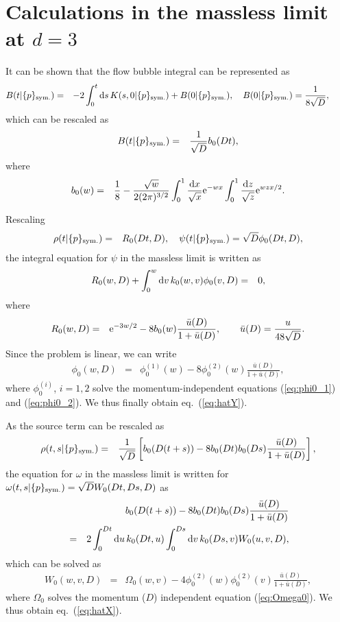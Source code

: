 \documentclass[preprint]{ptephy_v1}%
\newcommand{\rme}{{\rm e}}
\newcommand{\rmd}{{\rm d}}
\begin{document}
\section{Calculations in the massless limit at $d=3$}
\label{app:massless}
 It can be shown that the flow bubble integral can be represented as
\begin{eqnarray}
B(t\vert  \{ p\}_{\rm sym.}) &=& -2\int_0^{ t} \rmd s\,  K (s,0 \vert   \{ p\}_{\rm sym.}) + B(0\vert   \{ p\}_{\rm sym.}), \quad B(0\vert   \{ p\}_{\rm sym.}) =\frac{1}{8\sqrt{D}},~~~~~~~
\end{eqnarray}
which can be rescaled as
\begin{eqnarray}
B(t\vert  \{ p\}_{\rm sym.}) &=& \frac{1}{\sqrt{D}}b_0(Dt),
\end{eqnarray}
where
\begin{eqnarray}
b_0(w) &=&\frac{1}{8} -\frac{\sqrt{w}}{2(2\pi)^{3/2}}\int_0^1\frac{ \rmd x}{\sqrt{x}}\rme^{-wx}\int_0^1\frac{ \rmd z}{\sqrt{z}}\rme^{wzx/2}.
\label{eq:b0}
\end{eqnarray}

Rescaling
\begin{eqnarray}
\rho(t\vert   \{ p\}_{\rm sym.}) &=& R_0(Dt, D),
\quad
\psi(t \vert   \{ p\}_{\rm sym.}) = \sqrt{D} \phi_0(Dt,D),
\end{eqnarray}
the integral equation for $\psi$ in the massless limit is written as
\begin{eqnarray}
R_0(w, D) +\int_0^w \rmd v\, k_0(w,v) \phi_0(v,D) &=& 0 ,
\end{eqnarray}
where
\begin{eqnarray}
R_0(w,D) &=& \rme^{-3w/2} -8b_0(w)\dfrac{\bar u(D)}{1+ \bar u(D)},
\qquad \bar u(D)= \dfrac{u}{48\sqrt{D}}.
\end{eqnarray}
Since the problem is linear, we can write
\begin{eqnarray}
\phi_0(w,D) &=& \phi_0^{(1)}(w) - 8 \phi_0^{(2)}(w) \frac{\bar u(D)}{1+\bar u(D)} ,
\end{eqnarray}
where $\phi_0^{(i)}$,  $i=1,2$ solve the momentum-independent equations (\ref{eq:phi0_1}) and (\ref{eq:phi0_2}).
We thus finally obtain eq.~(\ref{eq:hatY}).

As the source term can be rescaled as
\begin{eqnarray}
\rho(t,s\vert  \{ p\}_{\rm sym.}) &=&\frac{1}{\sqrt{D}}\left[ b_0(D(t+s)) -8 b_0(Dt) b_0(Ds)\frac{\bar u(D)}{1+\bar u(D)} \right], 
\end{eqnarray}
the equation for $\omega$ in the massless limit is written for $\omega(t,s\vert  \{ p\}_{\rm sym.})= \sqrt{D}W_0(Dt,Ds,D)$ as
\begin{eqnarray}
&&b_0(D(t+s)) -8 b_0(Dt) b_0(Ds)\frac{\bar u(D)}{1+\bar u(D)} \nonumber \\&=&
2\int_0^{Dt} \rmd u\, k_0(Dt,u) \int_0^{Ds} \rmd v\, k_0(Ds,v) W_0( u,v,D),
\end{eqnarray}
which can be solved as
\begin{eqnarray}
W_0(w,v , D) &=& \Omega_0(w,v) - 4 \phi_0^{(2)}(w) \phi_0^{(2)}(v) \frac{\bar u(D)} {1+\bar u(D)},
\end{eqnarray}
where $\Omega_0$ solves the momentum ($D$) independent equation (\ref{eq:Omega0}).
We thus obtain eq.~(\ref{eq:hatX}). 
\end{document}
